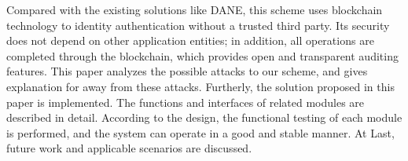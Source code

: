 \begin{eabstract}
Compared with the existing solutions like DANE, this scheme uses blockchain technology to identity authentication without a trusted third party. Its security does not depend on other application entities; in addition, all operations are completed through the blockchain, which provides open and transparent auditing features. This paper analyzes the possible attacks to our scheme, and gives explanation for away from these attacks. Furtherly, the solution proposed in this paper is implemented. The functions and interfaces of related modules are described in detail. According to the design, the functional testing of each module is performed, and the system can operate in a good and stable manner. At Last, future work and applicable scenarios are discussed.

\end{eabstract}

